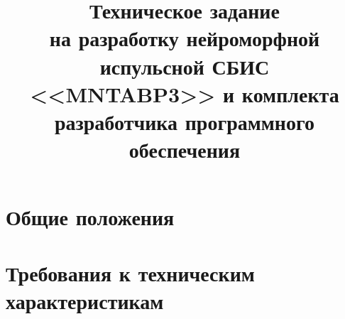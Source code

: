 \documentclass[11pt,a4paper]{mntrpt}
\newcommand{\характеристика}[4]{
  \noindent\vspace{5pt}\begin{minipage}[b]{#1}{#2}\end{minipage}
  \ifthenelse{\equal{#4}{}}{}{
    \hspace{2pt} ---
    \begin{minipage}[b]{#3}{#4}\end{minipage}}

}
\begin{document}


\title{\textbf{Техническое задание} \\
  на разработку нейроморфной испульсной СБИС <<MNTABP3>> и комплекта
  разработчика программного обеспечения}
\docnum{}
\maketitle
\setcounter{page}{2}

\section{Общие положения}


\section{Требования к техническим характеристикам}


\cleardoublepage
{}
\printbibliography%
\end{document}
